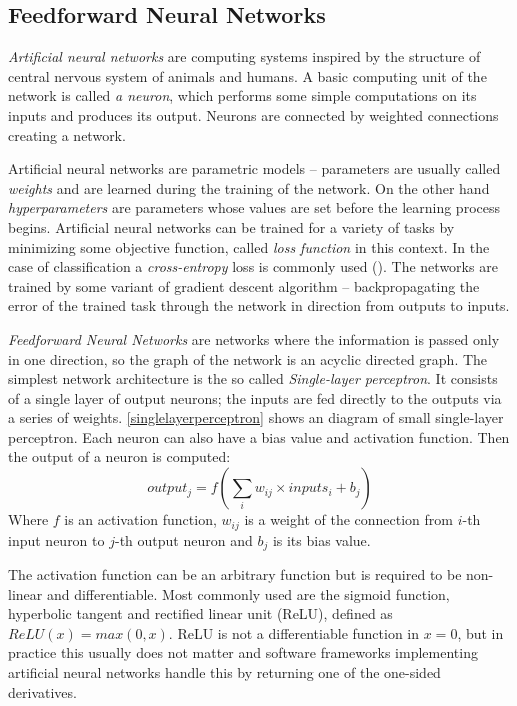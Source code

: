 \subsection{Feedforward Neural Networks}
\textit{Artificial neural networks} are computing systems inspired by the structure of central nervous system of animals and humans. A basic computing unit of the network is called \textit{a neuron}, which performs some simple computations on its inputs and produces its output. Neurons are connected by weighted connections creating a network. \par
Artificial neural networks are parametric models -- parameters are usually called \textit{weights} and are learned during the training of the network. On the other hand \textit{hyperparameters} are parameters whose values are set before the learning process begins. Artificial neural networks can be trained for a variety of tasks by minimizing some objective function, called \textit{loss function} in this context. In the case of classification a \textit{cross-entropy} loss is commonly used (\cite{goodfellow_deep_2016}). The networks are trained by some variant of gradient descent algorithm -- backpropagating the error of the trained task through the network in direction from outputs to inputs. \par
\textit{Feedforward Neural Networks} are networks where the information is passed only in one direction, so the graph of the network is an acyclic directed graph. The simplest network architecture is the so called \textit{Single-layer perceptron}. It consists of a single layer of output neurons; the inputs are fed directly to the outputs via a series of weights. \autoref{singlelayerperceptron} shows an diagram of small single-layer perceptron. Each neuron can also have a bias value and activation function. Then the output of a neuron is computed: $$output_j = f(\sum_{i} {w_{ij}\times inputs_i + b_j})$$ Where $f$ is an activation function, $w_{ij}$ is a weight of the connection from $i$-th input neuron to $j$-th output neuron and $b_j$ is its bias value. 

The activation function can be an arbitrary function but is required to be non-linear and differentiable. Most commonly used are the sigmoid function, hyperbolic tangent and rectified linear unit (ReLU), defined as $ReLU(x) = max(0,x)$. ReLU is not a differentiable function in $x=0$, but in practice this usually does not matter and software frameworks implementing artificial neural networks handle this by returning one of the one-sided derivatives.\par  
